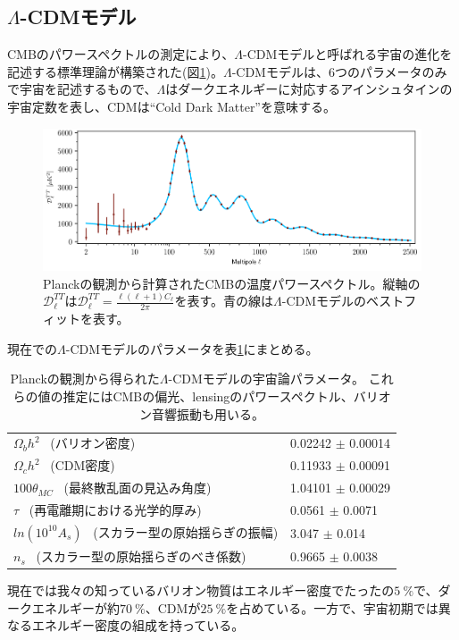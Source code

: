 \subsection{$\Lambda$-CDMモデル}
CMBのパワースペクトルの測定により、$\Lambda$-CDMモデルと呼ばれる宇宙の進化を記述する標準理論が構築された(図\ref{fit_planck})。$\Lambda$-CDMモデルは、6つのパラメータのみで宇宙を記述するもので、$\Lambda$はダークエネルギーに対応するアインシュタインの宇宙定数を表し、CDMは``Cold Dark Matter''を意味する。
\begin{figure}[htbp]
  \centering
  \includegraphics[width=0.85\columnwidth]{2_cosmology/figs/plank_cltt.pdf}
  \caption{Planckの観測から計算されたCMBの温度パワースペクトル\cite{Planck_T}。縦軸の$\mathcal{D}^{TT}_{\ell}$は$\mathcal{D}^{TT}_{\ell} = \frac{\ell(\ell+1)C_{\ell}}{2\pi}$を表す。青の線は$\Lambda$-CDMモデルのベストフィットを表す。}
  \label{fit_planck}
\end{figure}
現在での$\Lambda$-CDMモデルのパラメータを表\ref{6params}にまとめる。
\vspace{2mm}
\begin{table}[htbp]
  \centering
  \caption{Planckの観測から得られた$\Lambda$-CDMモデルの宇宙論パラメータ\cite{Planck_T}。
  これらの値の推定にはCMBの偏光、lensingのパワースペクトル、バリオン音響振動も用いる。}
  \vspace{2mm}
  \begin{tabular}{l|l}\hline\hline
    $\Omega_{b} h^2$ ~(バリオン密度)& 0.02242 $\pm$ 0.00014 \\
    $\Omega_{c} h^2$ ~(CDM密度)& 0.11933 $\pm$ 0.00091 \\
    $100\theta_{MC}$ ~(最終散乱面の見込み角度) & 1.04101 $\pm$ 0.00029 \\
    $\tau$ ~(再電離期における光学的厚み)& 0.0561 $\pm$ 0.0071 \\
    $ln(10^{10}A_s)$ ~(スカラー型の原始揺らぎの振幅) & 3.047 $\pm$ 0.014 \\
    $n_s$ ~(スカラー型の原始揺らぎのべき係数)& 0.9665 $\pm$ 0.0038 \\ \hline\hline
  \end{tabular}
  \label{6params}
\end{table}
現在では我々の知っているバリオン物質はエネルギー密度でたったの$\SI{5}{\%}$で、ダークエネルギーが約$\SI{70}{\%}$、CDMが$\SI{25}{\%}$を占めている。一方で、宇宙初期では異なるエネルギー密度の組成を持っている。


